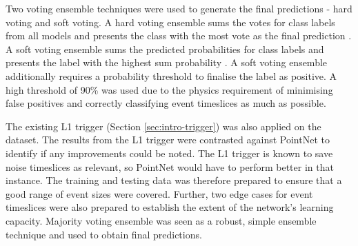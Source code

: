 Two voting ensemble techniques were used to generate the final predictions - hard voting and soft voting. A hard voting ensemble sums the votes for class labels from all models and presents the class with the most vote as the final prediction \cite{witten2002data}. A soft voting ensemble sums the predicted probabilities for class labels and presents the label with the highest sum probability \cite{witten2002data}. A soft voting ensemble additionally requires a probability threshold to finalise the label as positive. A high threshold of 90\% was used due to the physics requirement of minimising false positives and correctly classifying event timeslices as much as possible.

The existing L1 trigger (Section \ref{sec:intro-trigger}) was also applied on the dataset. The results from the L1 trigger were contrasted against PointNet to identify if any improvements could be noted. The L1 trigger is known to save noise timeslices as relevant, so PointNet would have to perform better in that instance. The training and testing data was therefore prepared to ensure that a good range of event sizes were covered. Further, two edge cases for event timeslices were also prepared to establish the extent of the network's learning capacity. Majority voting ensemble was seen as a robust, simple ensemble technique and used to obtain final predictions.

